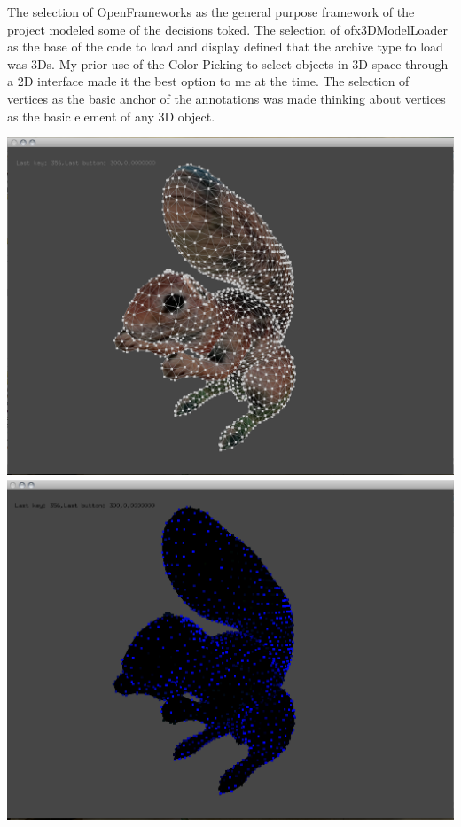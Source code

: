 The selection of OpenFrameworks as the general purpose framework of the project modeled some of the decisions toked. The selection of ofx3DModelLoader as the base of the code to load and display defined that the archive type to load was 3Ds. My prior use of the Color Picking to select objects in 3D space through a 2D interface made it the best option to me at the time. The selection of vertices as the basic anchor of the annotations was made thinking about vertices as the basic element of any 3D object.

\includegraphics[scale=0.18]{Images/prototype1_normal.png}
\includegraphics[scale=0.18]{Images/prototype1_picking.png}

